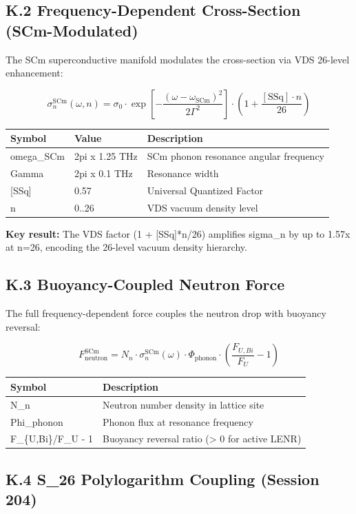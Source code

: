 \documentclass[11pt]{article}
\begin{document}
\subsection*{K.2 Frequency-Dependent Cross-Section (SCm-Modulated)}

The SCm superconductive manifold modulates the cross-section via VDS 26-level enhancement:

$$\sigma_n^{\mathrm{SCm}}(\omega, n) = \sigma_0 \cdot \exp\!\left[-\frac{(\omega - \omega_{\mathrm{SCm}})^2}{2\Gamma^2}\right] \cdot \left(1 + \frac{[\text{SSq}] \cdot n}{26}\right)$$

\begin{center}
\begin{longtable}{lll}
\toprule
Symbol & Value & Description \tabularnewline
\midrule
\endhead
omega\_SCm & 2pi x 1.25 THz & SCm phonon resonance angular frequency \tabularnewline
Gamma & 2pi x 0.1 THz & Resonance width \tabularnewline
{}[SSq] & 0.57 & Universal Quantized Factor \tabularnewline
n & 0..26 & VDS vacuum density level \tabularnewline
\bottomrule
\end{longtable}
\end{center}

\textbf{Key result:} The VDS factor (1 + [SSq]*n/26) amplifies sigma\_n by up to 1.57x at n=26, encoding the 26-level vacuum density hierarchy.

\subsection*{K.3 Buoyancy-Coupled Neutron Force}

The full frequency-dependent force couples the neutron drop with buoyancy reversal:

$$F_{\mathrm{neutron}}^{\mathrm{SCm}} = N_n \cdot \sigma_n^{\mathrm{SCm}}(\omega) \cdot \Phi_{\mathrm{phonon}} \cdot \left(\frac{F_{U,Bi}}{F_U} - 1\right)$$

\begin{center}
\begin{longtable}{ll}
\toprule
Symbol & Description \tabularnewline
\midrule
\endhead
N\_n & Neutron number density in lattice site \tabularnewline
Phi\_phonon & Phonon flux at resonance frequency \tabularnewline
F\_\{U,Bi\}/F\_U - 1 & Buoyancy reversal ratio (> 0 for active LENR) \tabularnewline
\bottomrule
\end{longtable}
\end{center}

\subsection*{K.4 S\_26 Polylogarithm Coupling (Session 204)}
\end{document}
